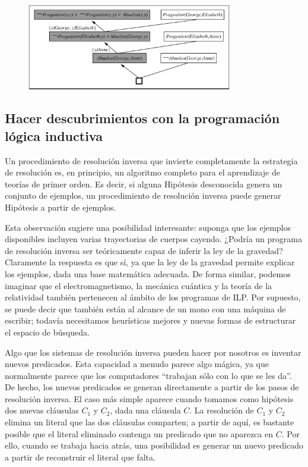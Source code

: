 \documentclass[12 pt, a4paper]{article}
\begin{document}
				\begin{figure}[h]
					\centering
					\includegraphics[width=0.8\textwidth]{./section3/fig9.png}
				\end{figure}
				
			\subsection{Hacer descubrimientos con la programación lógica inductiva}
				Un procedimiento de resolución inversa que invierte completamente la estrategia de resolución es, en principio, un algoritmo completo para el aprendizaje de teorías de primer orden. Es decir, si alguna Hipótesis desconocida genera un conjunto de ejemplos, un procedimiento de resolución inversa puede generar Hipótesis a partir de ejemplos.
				
				Esta observación sugiere una posibilidad interesante: suponga que los ejemplos disponibles incluyen varias trayectorias de cuerpos cayendo. ¿Podría un programa de resolución inversa ser teóricamente capaz de inferir la ley de la gravedad? Claramente la respuesta es que sí, ya que la ley de la gravedad permite explicar los ejemplos, dada una base matemática adecuada. De forma similar, podemos imaginar que el electromagnetismo, la mecánica cuántica y la teoría de la relatividad también pertenecen al ámbito de los programas de ILP. Por supuesto, se puede decir que también están al alcance de un mono con una máquina de escribir; todavía necesitamos heurísticas mejores y nuevas formas de estructurar el espacio de búsqueda.
				
				Algo que los sistemas de resolución inversa pueden hacer por nosotros es inventar nuevos predicados. Esta capacidad a menudo parece algo mágica, ya que normalmente parece que los computadores ``trabajan sólo con lo que se les da''. De hecho, los nuevos predicados se generan directamente a partir de los pasos de resolución inversa. El caso más simple aparece cuando tomamos como hipótesis dos nuevas cláusulas $C_{1}$ y $C_{2}$, dada una cláusula $C$. La resolución de $C_{1}$ y $C_{2}$ elimina un literal que las dos cláusulas comparten; a partir de aquí, es bastante posible que el literal eliminado contenga un predicado que no aparezca en $C$. Por ello, cuando se trabaja hacia atrás, una posibilidad es generar un nuevo predicado a partir de reconstruir el literal que falta.
				
\end{document}
